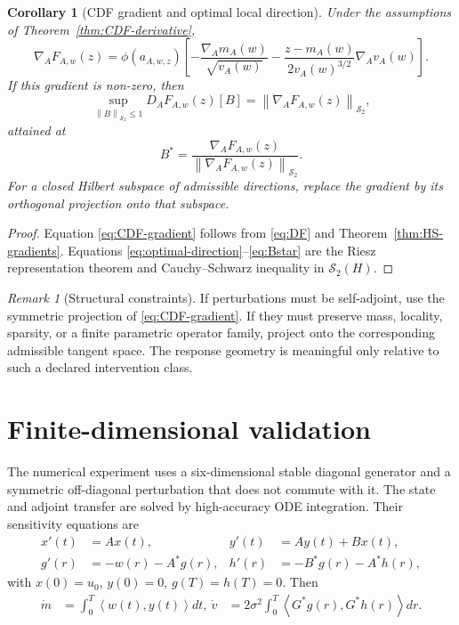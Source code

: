 \documentclass[11pt]{article}
\newtheorem{corollary}[assumption]{Corollary}
\theoremstyle{remark}
\newtheorem{remark}[assumption]{Remark}
\newcommand{\HS}{\mathcal S_2}
\newcommand{\ph}{\phi}
\newcommand{\ip}[2]{\left\langle #1,#2\right\rangle}
\newcommand{\norm}[1]{\left\lVert #1\right\rVert}
\begin{document}
\begin{corollary}[CDF gradient and optimal local direction]\label{cor:CDF-gradient}
Under the assumptions of Theorem~\ref{thm:CDF-derivative},
\begin{equation}\label{eq:CDF-gradient}
 \nabla_AF_{A,w}(z)
 =
 \ph(a_{A,w,z})
 \left[
 -\frac{\nabla_Am_A(w)}{\sqrt{v_A(w)}}
 -\frac{z-m_A(w)}{2v_A(w)^{3/2}}
 \nabla_Av_A(w)
 \right].
\end{equation}
If this gradient is non-zero, then
\begin{equation}\label{eq:optimal-direction}
 \sup_{\norm{B}_{\HS}\le1}
 D_AF_{A,w}(z)[B]
 =
 \norm{\nabla_AF_{A,w}(z)}_{\HS},
\end{equation}
attained at
\begin{equation}\label{eq:Bstar}
 B^*
 =
 \frac{\nabla_AF_{A,w}(z)}
 {\norm{\nabla_AF_{A,w}(z)}_{\HS}}.
\end{equation}
For a closed Hilbert subspace of admissible directions, replace the gradient by its orthogonal projection onto that subspace.
\end{corollary}

\begin{proof}
Equation \eqref{eq:CDF-gradient} follows from \eqref{eq:DF} and Theorem~\ref{thm:HS-gradients}. Equations \eqref{eq:optimal-direction}--\eqref{eq:Bstar} are the Riesz representation theorem and Cauchy--Schwarz inequality in $\HS(H)$.
\end{proof}

\begin{remark}[Structural constraints]
If perturbations must be self-adjoint, use the symmetric projection of \eqref{eq:CDF-gradient}. If they must preserve mass, locality, sparsity, or a finite parametric operator family, project onto the corresponding admissible tangent space. The response geometry is meaningful only relative to such a declared intervention class.
\end{remark}

\section{Finite-dimensional validation}

The numerical experiment uses a six-dimensional stable diagonal generator and a symmetric off-diagonal perturbation that does not commute with it. The state and adjoint transfer are solved by high-accuracy ODE integration. Their sensitivity equations are
\begin{align}
 x'(t)&=Ax(t),& y'(t)&=Ay(t)+Bx(t),
 \label{eq:forward-sens}\\
 g'(r)&=-w(r)-A^*g(r),& h'(r)&=-B^*g(r)-A^*h(r),
 \label{eq:backward-sens}
\end{align}
with $x(0)=u_0$, $y(0)=0$, $g(T)=h(T)=0$. Then
\begin{align}
 \dot m&=\int_0^T\ip{w(t)}{y(t)}dt,\
 \dot v&=2\sigma^2\int_0^T\ip{G^*g(r)}{G^*h(r)}dr.
\end{align}
\end{document}
